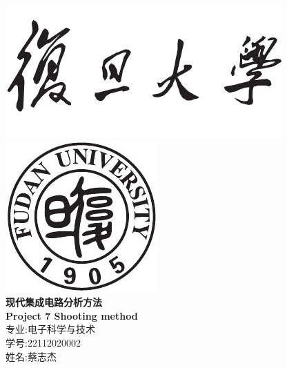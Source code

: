 \documentclass[12pt]{article}
\newcommand{\hmwkTitle}{Project 7 Shooting method}
\newcommand{\hmwkAuthorName}{姓名:蔡志杰 }
\newcommand{\hmwMajor}{专业:电子科学与技术}
\newcommand{\hmwNumber}{学号:22112020002}
\begin{document}
\begin{sloppypar}
\begin{titlepage}
\begin{center}



\includegraphics[scale = 0.9]{fudan.jpg}\\
\includegraphics[scale = 0.6]{fudan_logo.jpg}\\
\vspace{0.5in}
\linespread{1.9}\huge {\bfseries 现代集成电路分析方法}\\
\linespread{1.9}\LARGE {\bfseries \textbf{\hmwkTitle}}\\
\vspace{1.0in}
\large \hmwMajor{}\\
\large \hmwNumber{}\\
\large \hmwkAuthorName{}\\


\end{center}
\end{titlepage}
\end{sloppypar}
\end{document}
